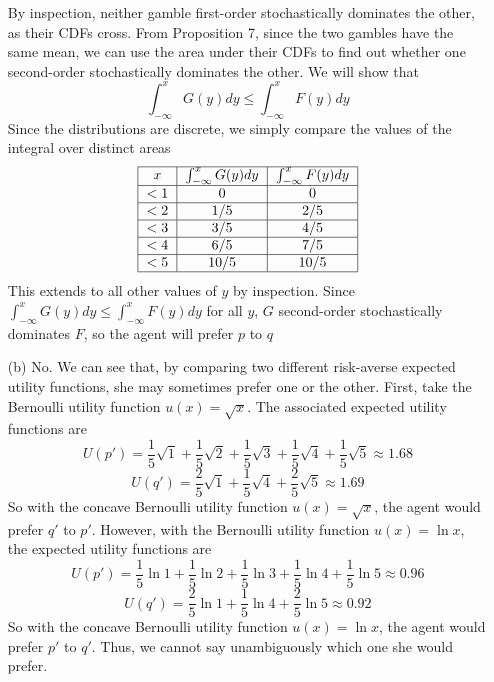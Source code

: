 \documentclass[12pt]{article}
\begin{document}
\begin{itemize}
     By inspection, neither gamble first-order stochastically dominates the other, as their CDFs cross. From Proposition 7, since the two gambles have the same mean, we can use the area under their CDFs to find out whether one second-order stochastically dominates the other. We will show that
    \[
    \int_{-\infty}^x G(y)dy \le \int_{-\infty}^x F(y)dy
    \]
    Since the distributions are discrete, we simply compare the values of the integral over distinct areas
    \[
    \begin{tabular}{|c|c|c|}
        \hline
        $x$ & $\int_{-\infty}^x G(y)dy$ & $\int_{-\infty}^x F(y)dy$ \\
        \hline
        $<1$ & 0 & 0 \\
        \hline
        $<2$ & 1/5 & 2/5\\
        \hline
        $<3$ & 3/5 & 4/5\\
        \hline
        $<4$ & 6/5& 7/5\\
        \hline
        $<5$ & 10/5& 10/5\\
        \hline
    \end{tabular}
    \]
    This extends to all other values of $y$ by inspection. Since $\int_{-\infty}^x G(y)dy \le \int_{-\infty}^x F(y)dy$ for all $y$, $G$ second-order stochastically dominates $F$, so the agent will prefer $p$ to $q$

    \item[(b)] No. We can see that, by comparing two different risk-averse expected utility functions, she may sometimes prefer one or the other. First, take the Bernoulli utility function $u(x) = \sqrt{x}$. The associated expected utility functions are
    \[
    U(p') = \frac{1}{5}\sqrt{1} + \frac{1}{5}\sqrt{2} + \frac{1}{5}\sqrt{3} + \frac{1}{5}\sqrt{4} + \frac{1}{5}\sqrt{5} \approx 1.68
    \]
    \[
    U(q') = \frac{2}{5}\sqrt{1} + \frac{1}{5}\sqrt{4} + \frac{2}{5}\sqrt{5} \approx 1.69
    \]
    So with the concave Bernoulli utility function $u(x) = \sqrt{x}$, the agent would prefer $q'$ to $p'$. However, with the Bernoulli utility function $u(x) = \ln x$, the expected utility functions are
    \[
    U(p') = \frac{1}{5}\ln{1} + \frac{1}{5}\ln{2} + \frac{1}{5}\ln{3} + \frac{1}{5}\ln{4} + \frac{1}{5}\ln{5} \approx 0.96
    \]
    \[
    U(q') = \frac{2}{5}\ln{1} + \frac{1}{5}\ln{4} + \frac{2}{5}\ln{5} \approx 0.92
    \]
    So with the concave Bernoulli utility function $u(x) = \ln{x}$, the agent would prefer $p'$ to $q'$. Thus, we cannot say unambiguously which one she would prefer.


\end{itemize}
\end{document}
